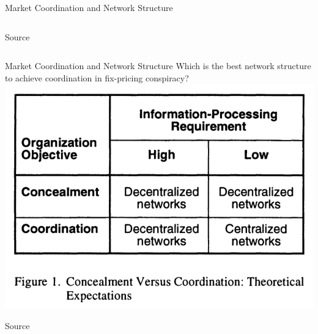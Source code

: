\documentclass[aspectratio=1610]{beamer}
\begin{document}
\begin{frame}{Market Coordination and Network Structure}
\begin{columns}
\begin{column}{0.5\textwidth}
			\raggedleft Source~\cite[][page 849]{baker_faulkner_1993}
		\end{column}


	\end{columns}
\end{frame}


\begin{frame}{Market Coordination and Network Structure}
	{Which is the best network structure to achieve coordination in fix-pricing conspiracy?}
	\centering
	\includegraphics[height=.8\textheight]{images/two_by_two.png}

	\raggedleft Source~\cite[][page 845]{baker_faulkner_1993}
\end{frame}
\end{document}
